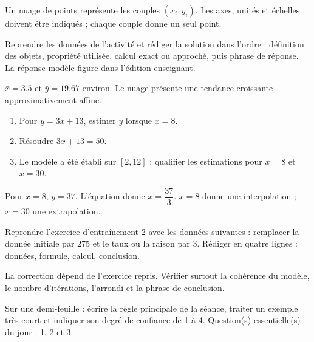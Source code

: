 \begin{summary}Un nuage de points représente les couples $(x_i,y_i)$. Les axes, unités et échelles doivent être indiqués ; chaque couple donne un seul point.\end{summary}

\begin{example}
Reprendre les données de l'activité et rédiger la solution dans l'ordre : définition des objets, propriété utilisée, calcul exact ou approché, puis phrase de réponse. La réponse modèle figure dans l'édition enseignant.
\end{example}
\begin{solution}$\bar x=\num{3,5}$ et $\bar y=\num{19,67}$ environ. Le nuage présente une tendance croissante approximativement affine.\end{solution}

\begin{exercise}[essentiel]
\begin{enumerate}\item Pour $y=3x+13$, estimer $y$ lorsque $x=8$.\item Résoudre $3x+13=50$.\item Le modèle a été établi sur $[2,12]$ : qualifier les estimations pour $x=8$ et $x=30$.\end{enumerate}
\end{exercise}
\begin{solution}Pour $x=8$, $y=37$. L'équation donne $x=\dfrac{37}{3}$. $x=8$ donne une interpolation ; $x=30$ une extrapolation.\end{solution}


\begin{homework}Reprendre l'exercice d'entraînement 2 avec les données suivantes : remplacer la donnée initiale par $275$ et le taux ou la raison par $3$. Rédiger en quatre lignes : données, formule, calcul, conclusion.\end{homework}
\begin{solution}La correction dépend de l'exercice repris. Vérifier surtout la cohérence du modèle, le nombre d'itérations, l'arrondi et la phrase de conclusion.\end{solution}

\begin{exitticket}[3 minutes]Sur une demi-feuille : écrire la règle principale de la séance, traiter un exemple très court et indiquer son degré de confiance de 1 à 4. Question(s) essentielle(s) du jour : 1, 2 et 3.\end{exitticket}

